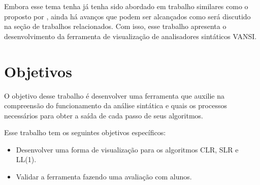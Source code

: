 Embora esse tema tenha já tenha sido abordado em trabalho similares como o proposto por \textcite{pavt}, ainda há avanços que podem ser alcançados como será discutido na seção de trabalhos relacionados. Com isso, esse trabalho apresenta o desenvolvimento da ferramenta de visualização de analisadores sintáticos VANSI.

\section{Objetivos}
O objetivo desse trabalho é desenvolver uma ferramenta que auxilie na compreensão do funcionamento da análise sintática e quais os processos necessários para obter a saída de cada passo de seus algoritmos.

Esse trabalho tem os seguintes objetivos específicos:
\begin{itemize}[label=$\sbullet$]
    \item Desenvolver uma forma de visualização para os algoritmos CLR, SLR e LL(1).
    \item Validar a ferramenta fazendo uma avaliação com alunos.
\end{itemize}

